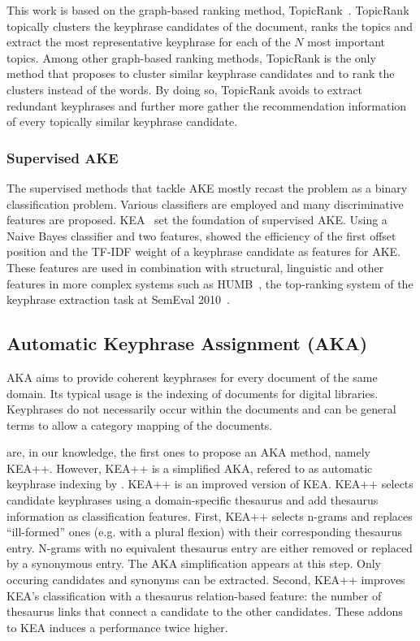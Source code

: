       This work is based on the graph-based ranking method,
      TopicRank~\cite{bougouin2013topicrank}. TopicRank topically clusters the
      keyphrase candidates of the document, ranks the topics and extract the
      most representative keyphrase for each of the $N$ most important topics.
      Among other graph-based ranking methods, TopicRank is the only method that
      proposes to cluster similar keyphrase candidates and to rank the clusters
      instead of the words. By doing so, TopicRank avoids to extract redundant
      keyphrases and further more gather the recommendation information of every
      topically similar keyphrase candidate.

    \subsubsection{Supervised AKE}
    \label{subsubsec:supervised_ake}
      The supervised methods that tackle AKE mostly recast the problem as a
      binary classification problem. Various classifiers are employed and many
      discriminative features are proposed. KEA~\cite{witten1999kea} set the
      foundation of supervised AKE. Using a Naive Bayes classifier and two
      features,  showed the efficiency of the first
      offset position and the TF-IDF weight of a keyphrase candidate as features
      for AKE. These features are used in combination with structural,
      linguistic and other features in more complex systems such as
      HUMB~\cite{lopez2010humb}, the top-ranking system of the keyphrase
      extraction task at SemEval 2010~\cite{kim2010semeval}.

  \subsection{Automatic Keyphrase Assignment (AKA)}
  \label{subsec:aka}
    AKA aims to provide coherent keyphrases for every document of the same
    domain. Its typical usage is the indexing of documents for digital
    libraries. Keyphrases do not necessarily occur within the documents and can
    be general terms to allow a category mapping of the documents.

     are, in our knowledge, the first ones
    to propose an AKA method, namely KEA++. However, KEA++ is a simplified AKA,
    refered to as automatic keyphrase indexing by
    . KEA++ is an improved version of KEA.
    KEA++ selects candidate keyphrases using a domain-specific thesaurus and add
    thesaurus information as classification features. First, KEA++ selects
    n-grams and replaces ``ill-formed'' ones (e.g. with a plural flexion) with
    their corresponding thesaurus entry. N-grams with no equivalent thesaurus
    entry are either removed or replaced by a synonymous entry. The AKA
    simplification appears at this step. Only occuring candidates and synonyms
    can be extracted. Second, KEA++ improves KEA's classification with a
    thesaurus relation-based feature: the number of thesaurus links that connect
    a candidate to the other candidates. These addons to KEA induces a
    performance twice higher.

